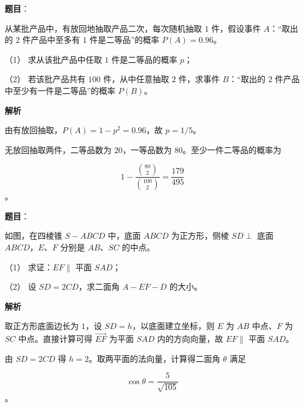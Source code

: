 \begin{answer}

\textbf{题目}：

从某批产品中，有放回地抽取产品二次，每次随机抽取 $1$ 件，假设事件 $A$：“取出的 $2$ 件产品中至多有 $1$ 件是二等品”的概率 $P(A)=0.96$。

（1） 求从该批产品中任取 $1$ 件是二等品的概率 $p$；

（2） 若该批产品共有 $100$ 件，从中任意抽取 $2$ 件，求事件 $B$：“取出的 $2$ 件产品中至少有一件是二等品”的概率 $P(B)$。

\textbf{解析}


由有放回抽取，$P(A)=1-p^2=0.96$，故 $p=1/5$。


无放回抽取两件，二等品数为 $20$，一等品数为 $80$。至少一件二等品的概率为

\nopagebreak[4]
\[
1-\frac{\binom{80}{2}}{\binom{100}{2}}
=\frac{179}{495}
\]
。



\end{answer}
\begin{answer}

\textbf{题目}：

如图，在四棱锥 $S-ABCD$ 中，底面 $ABCD$ 为正方形，侧棱 $SD\perp$ 底面 $ABCD$，$E\text{、}F$ 分别是 $AB\text{、}SC$ 的中点。
\nopagebreak[4]
\begin{center}\end{center}
\nopagebreak[4]
（1） 求证：$EF\parallel$ 平面 $SAD$；

（2） 设 $SD=2CD$，求二面角 $A-EF-D$ 的大小。

\textbf{解析}


取正方形底面边长为 $1$，设 $SD=h$，以底面建立坐标，则 $E$ 为 $AB$ 中点、$F$ 为 $SC$ 中点。直接计算可得 $\overrightarrow{EF}$ 为平面 $SAD$ 内的方向向量，故 $EF\parallel$ 平面 $SAD$。


由 $SD=2CD$ 得 $h=2$。取两平面的法向量，计算得二面角 $\theta$ 满足

\nopagebreak[4]
\[
\cos\theta=\frac5{\sqrt{105}}
\]
。



\end{answer}

